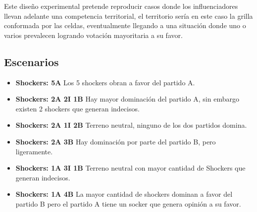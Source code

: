Este diseño experimental pretende reproducir casos donde los influenciadores
llevan adelante una competencia territorial, el territorio sería en este caso la grilla conformada por las celdas, eventualmente llegando a una
situación donde uno o varios prevalecen logrando votación mayoritaria a su favor.

\subsection{Escenarios} %
\label{sub:Escenarios}

\begin{itemize}
    \item \textbf{Shockers: 5A} Los 5 shockers obran a favor del partido A.
    \item \textbf{Shockers: 2A 2I 1B} Hay mayor dominación del partido A, sin embargo existen 2 shockers que generan indecisos.
    \item \textbf{Shockers: 2A 1I 2B} Terreno neutral, ninguno de los dos partidos domina.
    \item \textbf{Shockers: 2A 3B} Hay dominación por parte del partido B, pero ligeramente.
    \item \textbf{Shockers: 1A 3I 1B} Terreno neutral con mayor cantidad de Shockers que generan indecisos.
    \item \textbf{Shockers: 1A 4B} La mayor cantidad de shockers dominan a favor del partido B pero el partido A tiene un socker que genera opinión a su favor.  
\end{itemize}


